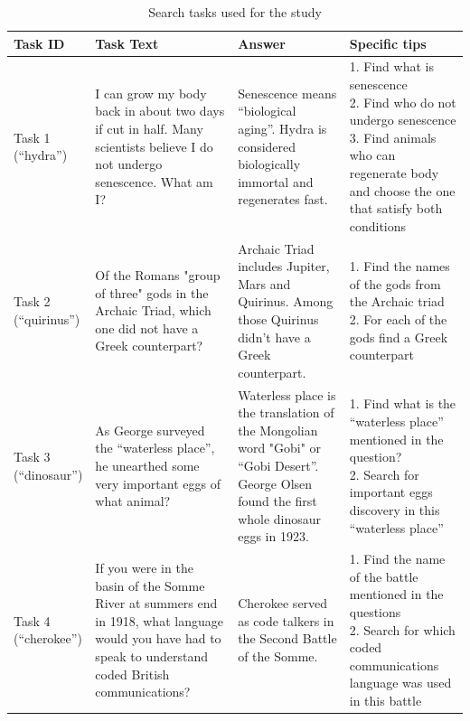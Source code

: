 \documentclass{sig-alternate}
\begin{document}
\begin{table}
\centering
\caption{Search tasks used for the study}
\label{table:tasks}
\begin{tabular}{|p{1.55cm}|p{4.5cm}|p{4.5cm}|p{5cm}|} \hline
Task ID & Task Text & Answer & Specific tips \\ \hline
\parbox[t]{1cm}{Task 1\\(``hydra'')} & I can grow my body back in about two days if cut in half. Many scientists believe I do not undergo senescence. What am I? & Senescence means ``biological aging''. Hydra is considered biologically immortal and regenerates fast. & \parbox[t]{5cm}{
1. Find what is senescence\\
2. Find who do not undergo senescence\\
3. Find animals who can regenerate body and choose the one that satisfy both conditions} \\ \hline
\parbox[t]{1cm}{Task 2\\(``quirinus'')} & Of the Romans "group of three" gods in the Archaic Triad, which one did not have a Greek counterpart? & Archaic Triad includes Jupiter, Mars and Quirinus. Among those Quirinus didn't have a Greek counterpart. &
\parbox[t]{5cm}{
1. Find the names of the gods from the Archaic triad\\
2. For each of the gods find a Greek counterpart
}\\ \hline
\parbox[t]{1cm}{Task 3\\(``dinosaur'')} & As George surveyed the ``waterless place'', he unearthed some very important eggs of what animal? & Waterless place is the translation of the Mongolian word "Gobi" or ``Gobi Desert''. George Olsen found the first whole dinosaur eggs in 1923. & \parbox[t]{5cm}{
1. Find what is the ``waterless place'' mentioned in the question?\\
2. Search for important eggs discovery in this ``waterless place''}\\ \hline
\parbox[t]{1cm}{Task 4\\(``cherokee'')} & If you were in the basin of the Somme River at summers end in 1918, what language would you have had to speak to understand coded British communications? & Cherokee served as code talkers in the Second Battle of the Somme. & \parbox[t]{5cm}{
1. Find the name of the battle mentioned in the questions\\
2. Search for which coded communications language was used in this battle\\
} \\ \hline
\end{tabular}
\end{table}
\end{document}
